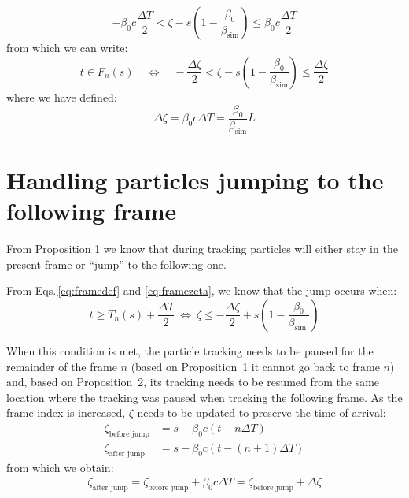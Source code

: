 \begin{equation}
-\beta_0 c \frac{\Delta T}{2} < \zeta - s \left(1 -  \frac{\beta_0}{\beta_\text{sim} }\right) \leq \beta_0 c\frac{\Delta T}{2}
\end{equation}
from which we can write:
\begin{equation}
\boxed{
t \in F_n(s) \quad \Leftrightarrow \quad
-\frac{\Delta \zeta}{2} < \zeta - s \left(1 -  \frac{\beta_0}{\beta_\text{sim} }\right) \leq \frac{\Delta \zeta}{2}
}
\label{eq:framezeta}
\end{equation}
where we have defined:
\begin{equation}
\boxed{
 \Delta \zeta = \beta_0 c \Delta T = \frac{\beta_0}{\beta_\text{sim}} L
}
\end{equation}

\section{Handling particles jumping to the following frame}

From Proposition 1 we know that during tracking particles will either stay in the present frame or ``jump'' to the following one.

From Eqs.\,\ref{eq:framedef} and \ref{eq:framezeta}, we know that the jump occurs when:
\begin{equation}
t \geq T_n(s) + \frac{\Delta T}{2}
~
\Leftrightarrow
~
\zeta \leq -\frac{\Delta \zeta}{2} + s\left(1-\frac{\beta_0}{\beta_{\text {sim }}}\right)
 \end{equation}

When this condition is met, the particle tracking needs to be paused for the remainder of the frame $n$ (based on Proposition~1 it cannot go back to frame $n$) and, based on Proposition~2, its tracking needs to be resumed from the same location where the tracking was paused when tracking the following frame.
As the frame index is increased, $\zeta$ needs to be updated to preserve the time of arrival:
\begin{align}
\zeta_\text{before jump} &= s  - \beta_0 c \left( t - n\Delta T \right) \\
\zeta_\text{after jump} &= s  - \beta_0 c \left( t - (n+1) \Delta T \right)
\end{align}
from which we obtain:
\begin{align}
\boxed{
\zeta_\text{after jump} = \zeta_\text{before jump} + \beta_0 c \Delta T = \zeta_\text{before jump} + \Delta \zeta
}
\end{align}




